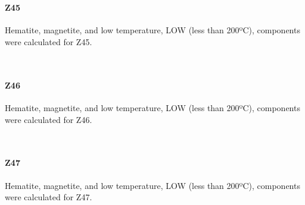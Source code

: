 \documentclass[11pt]{article}
\begin{document}
    \begin{center}
    \end{center}
    { \hspace*{\fill} \\}
    
    \paragraph{Z45}\label{z45}

    Hematite, magnetite, and low temperature, LOW (less than 200ºC),
components were calculated for Z45.



    \begin{center}
    \end{center}
    { \hspace*{\fill} \\}
    
    \paragraph{Z46}\label{z46}

    Hematite, magnetite, and low temperature, LOW (less than 200ºC),
components were calculated for Z46.



    \begin{center}
    \end{center}
    { \hspace*{\fill} \\}
    
    \paragraph{Z47}\label{z47}

    Hematite, magnetite, and low temperature, LOW (less than 200ºC),
components were calculated for Z47.



    \begin{center}
    \end{center}
    { \hspace*{\fill} \\}
    
\end{document}
